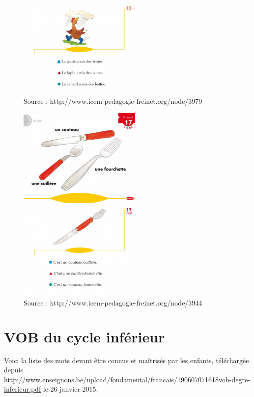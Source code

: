\begin{center}
\begin{figure}[h]
\begin{minipage}[c]{.46\linewidth}
      \includegraphics[width=6cm]{img/CP_niv2_f13verso.jpg}
   \end{minipage}
   \caption{Source : http://www.icem-pedagogie-freinet.org/node/3979}
\end{figure}
\vline
\vline
\begin{figure}[h]
   \begin{minipage}[c]{.46\linewidth}
      \includegraphics[width=6cm]{img/CP_niv3_f17recto.jpg}
   \end{minipage}  
   \begin{minipage}[c]{.46\linewidth}
      \includegraphics[width=6cm]{img/CP_niv3_f17verso.jpg}
   \end{minipage}
      \caption{Source : http://www.icem-pedagogie-freinet.org/node/3944}

\end{figure}
\end{center}

\newpage
\section{VOB du cycle inférieur \label{listeVob}}
Voici la liste des mots devant être connus et maîtrisés par les enfants, téléchargée depuis \url{http://www.enseignons.be/upload/fondamental/francais/190607071618vob-degre-inferieur.pdf} le 26 janvier 2015.


